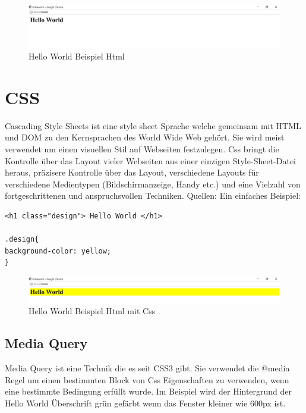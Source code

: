 \begin{figure}[H]
\begin{center}
	\includegraphics[scale=.6]{images/html.png}
\end{center}
	\caption{Hello World Beispiel Html}
	\label{fig:sample}
\end{figure}

\pagebreak 


\section{CSS}
Cascading Style Sheets ist eine style sheet Sprache welche gemeinsam mit HTML und DOM zu den Kernsprachen des World Wide Web gehört.
Sie wird meist verwendet um einen visuellen Stil auf Webseiten festzulegen.
Css bringt die Kontrolle über das Layout vieler Webseiten aus einer einzigen Style-Sheet-Datei heraus, präzisere Kontrolle über das Layout, verschiedene Layouts für verschiedene Medientypen (Bildschirmanzeige, Handy etc.) und eine Vielzahl von fortgeschrittenen und anspruchsvollen Techniken.
Quellen: \cite{_lesson_????}
Ein einfaches Beispiel:
\begin{lstlisting}
<h1 class="design"> Hello World </h1>

.design{
background-color: yellow;
}
\end{lstlisting}

\begin{figure}[H]
\begin{center}
	\includegraphics[scale=.6]{images/Css.png}
\end{center}
	\caption{Hello World Beispiel Html mit Css}
	\label{fig:sample}
\end{figure}


\pagebreak 
\subsection{Media Query}
Media Query ist eine Technik die es seit CSS3 gibt.
Sie verwendet die @media Regel um einen bestimmten Block von Css Eigenschaften zu verwenden, wenn eine bestimmte Bedingung erfüllt wurde. Im Beispiel wird der Hintergrund der Hello World Überschrift grün gefärbt wenn das Fenster kleiner wie 600px ist.

